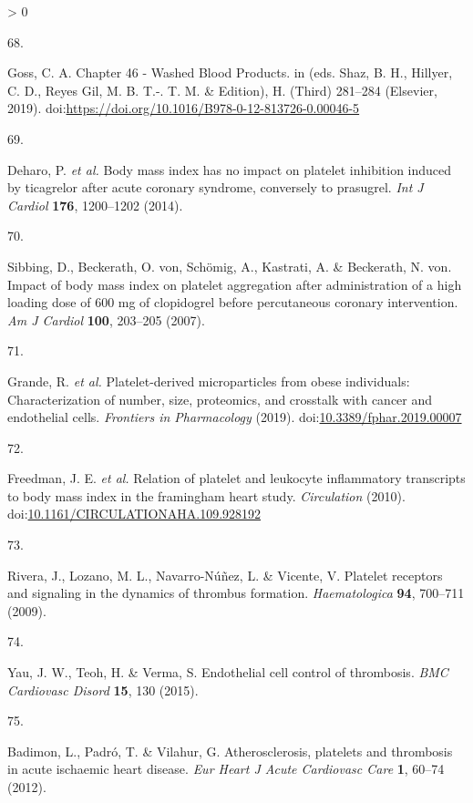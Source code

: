 \documentclass[11pt,twoside]{bristolthesis}
\newlength{\cslhangindent}
\newlength{\csllabelwidth}
\newenvironment{CSLReferences}[2] %
 {%
  \setlength{\parindent}{0pt}
  \ifodd #1 \everypar{\setlength{\hangindent}{\cslhangindent}}\ignorespaces\fi
  \ifnum #2 > 0
  \setlength{\parskip}{#2\baselineskip}
  \fi
 }%
 {}
\newcommand{\CSLLeftMargin}[1]{\parbox[t]{\csllabelwidth}{#1}}
\newcommand{\CSLRightInline}[1]{\parbox[t]{\linewidth - \csllabelwidth}{#1}\break}
\begin{document}
\begin{CSLReferences}{0}{0}
\leavevmode\hypertarget{ref-Goss2019}{}%
\CSLLeftMargin{68. }
\CSLRightInline{Goss, C. A. {Chapter 46 - Washed Blood Products}. in (eds. Shaz, B. H., Hillyer, C. D., Reyes Gil, M. B. T.-. T. M. \& Edition), H. (Third) 281--284 (Elsevier, 2019). doi:\url{https://doi.org/10.1016/B978-0-12-813726-0.00046-5}}

\leavevmode\hypertarget{ref-Deharo2014}{}%
\CSLLeftMargin{69. }
\CSLRightInline{Deharo, P. \emph{et al.} {Body mass index has no impact on platelet inhibition induced by ticagrelor after acute coronary syndrome, conversely to prasugrel}. \emph{Int J Cardiol} \textbf{176}, 1200--1202 (2014).}

\leavevmode\hypertarget{ref-Sibbing2007}{}%
\CSLLeftMargin{70. }
\CSLRightInline{Sibbing, D., Beckerath, O. von, Schömig, A., Kastrati, A. \& Beckerath, N. von. {Impact of body mass index on platelet aggregation after administration of a high loading dose of 600 mg of clopidogrel before percutaneous coronary intervention}. \emph{Am J Cardiol} \textbf{100}, 203--205 (2007).}

\leavevmode\hypertarget{ref-Grande2019}{}%
\CSLLeftMargin{71. }
\CSLRightInline{Grande, R. \emph{et al.} {Platelet-derived microparticles from obese individuals: Characterization of number, size, proteomics, and crosstalk with cancer and endothelial cells}. \emph{Frontiers in Pharmacology} (2019). doi:\href{https://doi.org/10.3389/fphar.2019.00007}{10.3389/fphar.2019.00007}}

\leavevmode\hypertarget{ref-Freedman2010}{}%
\CSLLeftMargin{72. }
\CSLRightInline{Freedman, J. E. \emph{et al.} {Relation of platelet and leukocyte inflammatory transcripts to body mass index in the framingham heart study}. \emph{Circulation} (2010). doi:\href{https://doi.org/10.1161/CIRCULATIONAHA.109.928192}{10.1161/CIRCULATIONAHA.109.928192}}

\leavevmode\hypertarget{ref-Rivera2009}{}%
\CSLLeftMargin{73. }
\CSLRightInline{Rivera, J., Lozano, M. L., Navarro-Núñez, L. \& Vicente, V. {Platelet receptors and signaling in the dynamics of thrombus formation}. \emph{Haematologica} \textbf{94}, 700--711 (2009).}

\leavevmode\hypertarget{ref-Yau2015}{}%
\CSLLeftMargin{74. }
\CSLRightInline{Yau, J. W., Teoh, H. \& Verma, S. {Endothelial cell control of thrombosis}. \emph{BMC Cardiovasc Disord} \textbf{15}, 130 (2015).}

\leavevmode\hypertarget{ref-Badimon2012}{}%
\CSLLeftMargin{75. }
\CSLRightInline{Badimon, L., Padró, T. \& Vilahur, G. {Atherosclerosis, platelets and thrombosis in acute ischaemic heart disease}. \emph{Eur Heart J Acute Cardiovasc Care} \textbf{1}, 60--74 (2012).}


\end{CSLReferences}
\end{document}
